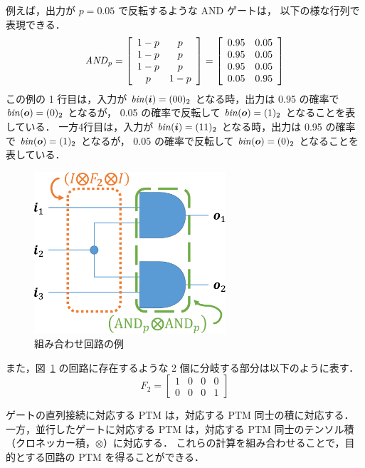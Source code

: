例えば，出力が $p = 0.05$ で反転するような AND ゲートは，
以下の様な行列で表現できる．
\begin{eqnarray}
  {\it AND}_p = \left[
    \begin{array}{cc}
      1 - p & p\\
      1 - p & p\\
      1 - p & p\\
      p     & 1 - p
    \end{array}
  \right]
= \left[
    \begin{array}{cc}
      0.95 & 0.05\\
      0.95 & 0.05\\
      0.95 & 0.05\\
      0.05 & 0.95
    \end{array}
  \right]
\end{eqnarray}
この例の 1 行目は，入力が ${\it bin}({\bm i}) = (00)_2$ となる時，出力は 0.95 の確率で ${\it bin}({\bm o}) = (0)_2$ となるが，
0.05 の確率で反転して ${\it bin}({\bm o}) = (1)_2$ となることを表している．
一方4行目は，入力が ${\it bin}({\bm i}) = (11)_2$ となる時，出力は 0.95 の確率で ${\it bin}({\bm o}) = (1)_2$ となるが，
0.05 の確率で反転して ${\it bin}({\bm o}) = (0)_2$ となることを表している．
\begin{figure}[tbp]
  \begin{center}
    \includegraphics[height=60mm,clip]{img/exgate.pdf}
    \caption{組み合わせ回路の例}
    \label{fig:exgate}
  \end{center}
\end{figure}
また，図~\ref{fig:exgate} の回路に存在するような 2 個に分岐する部分は以下のように表す．
\[
F_2 = \left[
    \begin{array}{cccc}
      1 & 0 & 0 & 0\\
      0 & 0 & 0 & 1
    \end{array}
  \right]
\]


ゲートの直列接続に対応する PTM は，対応する PTM 同士の積に対応する．
一方，並行したゲートに対応する PTM は，対応する PTM 同士のテンソル積（クロネッカー積，$\otimes$）に対応する．
これらの計算を組み合わせることで，目的とする回路の PTM を得ることができる．

